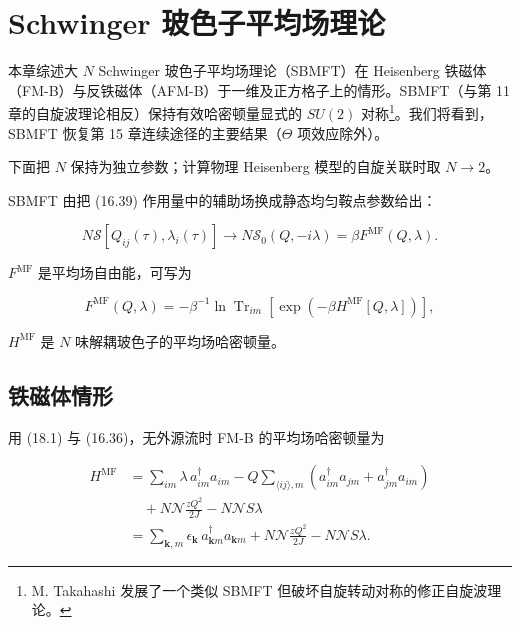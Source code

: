 \chapter{Schwinger 玻色子平均场理论}

本章综述大 $N$ Schwinger 玻色子平均场理论（SBMFT）在 Heisenberg 铁磁体（FM-B）与反铁磁体（AFM-B）于一维及正方格子上的情形。SBMFT（与第 11 章的自旋波理论相反）保持有效哈密顿量显式的 $SU(2)$ 对称\footnote{M. Takahashi 发展了一个类似 SBMFT 但破坏自旋转动对称的修正自旋波理论。}。我们将看到，SBMFT 恢复第 15 章连续途径的主要结果（$\Theta$ 项效应除外）。

下面把 $N$ 保持为独立参数；计算物理 Heisenberg 模型的自旋关联时取 $N \rightarrow 2$。

SBMFT 由把 (16.39) 作用量中的辅助场换成静态均匀鞍点参数给出：

\begin{equation*}
N \mathcal {S} [ Q _ {ij} ( \tau ), \lambda_ {i} ( \tau ) ] \rightarrow N \mathcal {S} _ {0} ( Q, - i \lambda ) = \beta F ^ {\mathrm{MF}} ( Q, \lambda ).
\tag{18.1}
\end{equation*}

$F^{\mathrm{MF}}$ 是平均场自由能，可写为

\begin{equation*}
F ^ {\mathrm{MF}} ( Q, \lambda ) = - \beta^ {- 1} \ln \operatorname{Tr}_{im} \left[ \exp \left( - \beta H ^ {\mathrm{MF}} [ Q, \lambda ] \right) \right] ,
\tag{18.2}
\end{equation*}

$H^{\mathrm{MF}}$ 是 $N$ 味解耦玻色子的平均场哈密顿量。

\section{铁磁体情形}

用 (18.1) 与 (16.36)，无外源流时 FM-B 的平均场哈密顿量为

\begin{align*}
H ^ {\mathrm{MF}} & = \sum_ {im} \lambda \, a _ {im} ^ {\dagger} a _ {im} - Q \sum_{\langle ij \rangle, m} \left( a _ {im} ^ {\dagger} a _ {jm} + a _ {jm} ^ {\dagger} a _ {im} \right)\\
& \quad + N \mathcal {N} \frac {z Q ^ {2}}{2 J} - N \mathcal {N} S \lambda\\
& = \sum_{\mathbf {k}, m} \epsilon_ {\mathbf {k}} \, a _ {\mathbf {k} m} ^ {\dagger} a _ {\mathbf {k} m} + N \mathcal {N} \frac {z Q ^ {2}}{2 J} - N \mathcal {N} S \lambda .
\tag{18.3}
\end{align*}

